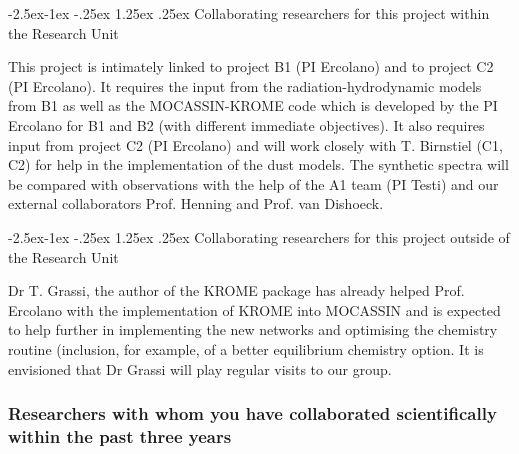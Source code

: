 \documentclass[10pt,fleqn,twoside]{article}
\makeatletter
\newcommand{\Tcol}{\color{blue}}
\renewcommand\paragraph{\@startsection{paragraph}{4}{\z@}%
            {-2.5ex\@plus -1ex \@minus -.25ex}%
            {1.25ex \@plus .25ex}%
            {\normalfont\normalsize\bfseries}}
\makeatother
\begin{document}
\paragraph{\Tcol Collaborating researchers for this project within the
  Research Unit}

This project is intimately linked to project B1 (PI Ercolano) and to project C2 (PI Ercolano). 
It requires the input from the radiation-hydrodynamic models from B1 as well as the MOCASSIN-KROME code which is developed by the PI Ercolano for B1 and B2 (with different immediate objectives). It also requires input from project C2 (PI Ercolano) and will work closely with T. Birnstiel (C1, C2) for help in the implementation of the dust models. The synthetic spectra will be compared with observations with the help of the A1 team (PI Testi) and our external collaborators Prof. Henning and Prof. van Dishoeck. 

\paragraph{\Tcol Collaborating researchers for this project outside of
  the Research Unit}

Dr T. Grassi, the author of the KROME package has already helped Prof. Ercolano with the implementation of KROME into MOCASSIN and is expected to help further in implementing the new networks and optimising the chemistry routine (inclusion, for example, of a better equilibrium chemistry option. 
It is envisioned that Dr Grassi will play regular visits to our group.    

\subsubsection{\Tcol Researchers with whom you have collaborated scientifically within the past three years}
\end{document}
